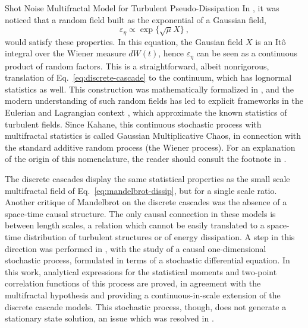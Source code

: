 \begin{chapter}{Shot Noise Multifractal Model for Turbulent Pseudo-Dissipation}
In \textcite{mandelbrot1972}, it was noticed that a random field built as the exponential of a Gaussian field,
\begin{equation} \label{eq:mandelbrot-dissip}
    \varepsilon_{\eta} \propto \exp \{ \sqrt{\mu} X\} \ ,    
\end{equation}
would satisfy these properties. In this equation, the Gausian field $X$ is an It\^o integral over the Wiener measure $dW(t)$, hence $\varepsilon_{\eta}$ can be seen as a continuous product of random factors. 
This is a straightforward, albeit nonrigorous, translation of Eq.~\eqref{eq:discrete-cascade} to the continuum, which has lognormal statistics as well. This construction was mathematically formalized in \textcite{kahane1985}, and the modern understanding of such random fields has led to explicit frameworks in the Eulerian \parencite{pereira2016} and Lagrangian context \parencite{pereira2018multifractal}, which approximate the known statistics of turbulent fields. Since Kahane, this continuous stochastic process with multifractal statistics is called Gaussian Multiplicative Chaos, in connection with the standard additive random process (the Wiener process). For an explanation of the origin of this nomenclature, the reader should consult the footnote in \textcite{rhodes2014}.

The discrete cascades display the same statistical properties as the small scale multifractal field of Eq.~\eqref{eq:mandelbrot-dissip}, but for a single scale ratio.
Another critique of Mandelbrot on the discrete cascades was the absence of a space-time causal structure. The only causal connection in these models is between length scales, a relation which cannot be easily translated to a space-time distribution of turbulent structures or of energy dissipation. A step in this direction was performed in \textcite{schmitt2003}, with the study of a causal one-dimensional stochastic process, formulated in terms of a stochastic differential equation.
In this work, analytical expressions for the statistical moments and two-point correlation functions of this process are proved, in agreement with the multifractal hypothesis and providing a continuous-in-scale extension of the discrete cascade models.
This stochastic process, though, does not generate a stationary state solution, an issue which was resolved in \textcite{pereira2018multifractal}.


\end{chapter}
